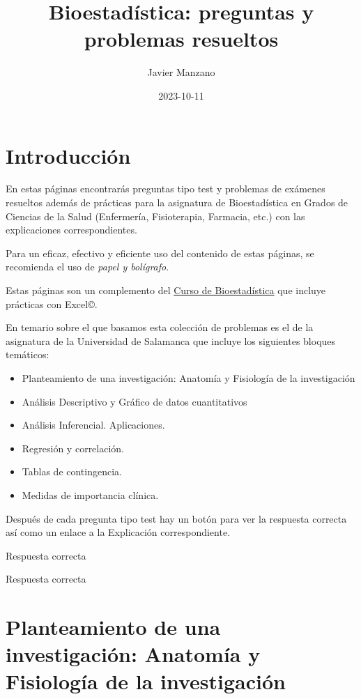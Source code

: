 \documentclass[
]{book}
\title{Bioestadística: preguntas y problemas resueltos}
\author{Javier Manzano}
\date{2023-10-11}
\begin{document}
\maketitle

{
\setcounter{tocdepth}{1}
\tableofcontents
}
\hypertarget{introducciuxf3n}{%
\chapter{Introducción}\label{introducciuxf3n}}

En estas páginas encontrarás preguntas tipo test y problemas de exámenes resueltos además de prácticas para la asignatura de Bioestadística en Grados de Ciencias de la Salud (Enfermería, Fisioterapia, Farmacia, etc.) con las explicaciones correspondientes.

Para un eficaz, efectivo y eficiente uso del contenido de estas páginas, se recomienda el uso de \emph{papel y bolígrafo}.

Estas páginas son un complemento del \href{https://1fjmanzano.github.io/bioestadistica/}{Curso de Bioestadística} que incluye prácticas con Excel©.

En temario sobre el que basamos esta colección de problemas es el de la asignatura de la Universidad de Salamanca que incluye los siguientes bloques temáticos:

\begin{itemize}
\item
  Planteamiento de una investigación: Anatomía y Fisiología de la investigación
\item
  Análisis Descriptivo y Gráfico de datos cuantitativos
\item
  Análisis Inferencial. Aplicaciones.
\item
  Regresión y correlación.
\item
  Tablas de contingencia.
\item
  Medidas de importancia clínica.
\end{itemize}

Después de cada pregunta tipo test hay un botón para ver la respuesta correcta así como un enlace a la Explicación correspondiente.

Respuesta correcta

Respuesta correcta

\hypertarget{planteamiento-de-una-investigaciuxf3n-anatomuxeda-y-fisiologuxeda-de-la-investigaciuxf3n}{%
\chapter{Planteamiento de una investigación: Anatomía y Fisiología de la investigación}\label{planteamiento-de-una-investigaciuxf3n-anatomuxeda-y-fisiologuxeda-de-la-investigaciuxf3n}}
\end{document}
